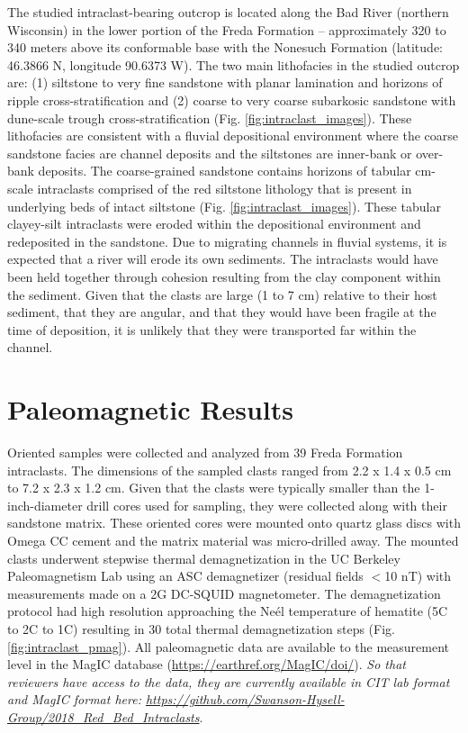\documentclass[draft]{agujournal2018}
\begin{document}
The studied intraclast-bearing outcrop is located along the Bad River (northern Wisconsin) in the lower portion of the Freda Formation -- approximately 320 to 340 meters above its conformable base with the Nonesuch Formation (latitude:  46.3866 \textdegree N, longitude 90.6373 \textdegree W). The two main lithofacies in the studied outcrop are: (1) siltstone to very fine sandstone with planar lamination and horizons of ripple cross-stratification and (2) coarse to very coarse subarkosic sandstone with dune-scale trough cross-stratification (Fig. \ref{fig:intraclast_images}). These lithofacies are consistent with a fluvial depositional environment where the coarse sandstone facies are channel deposits and the siltstones are inner-bank or over-bank deposits. The coarse-grained sandstone contains horizons of tabular cm-scale intraclasts comprised of the red siltstone lithology that is present in underlying beds of intact siltstone (Fig. \ref{fig:intraclast_images}). These tabular clayey-silt intraclasts were eroded within the depositional environment and redeposited in the sandstone. Due to migrating channels in fluvial systems, it is expected that a river will erode its own sediments. The intraclasts would have been held together through cohesion resulting from the clay component within the sediment. Given that the clasts are large (1 to 7 cm) relative to their host sediment, that they are angular, and that they would have been fragile at the time of deposition, it is unlikely that they were transported far within the channel.

\section*{Paleomagnetic Results}

Oriented samples were collected and analyzed from 39 Freda Formation intraclasts. The dimensions of the sampled clasts ranged from 2.2 x 1.4 x 0.5 cm to 7.2 x 2.3 x 1.2 cm. Given that the clasts were typically smaller than the 1-inch-diameter drill cores used for sampling, they were collected along with their sandstone matrix. These oriented cores were mounted onto quartz glass discs with Omega CC cement and the matrix material was micro-drilled away. The mounted clasts underwent stepwise thermal demagnetization in the UC Berkeley Paleomagnetism Lab using an ASC demagnetizer (residual fields $<$10 nT) with measurements made on a 2G DC-SQUID magnetometer. The demagnetization protocol had high resolution  approaching the Ne\'el temperature of hematite (5\textdegree C to 2\textdegree C to 1\textdegree C) resulting in 30 total thermal demagnetization steps (Fig. \ref{fig:intraclast_pmag}). All paleomagnetic data are available to the measurement level in the MagIC database (\url{https://earthref.org/MagIC/doi/}). \textit{So that reviewers have access to the data, they are currently available in CIT lab format and MagIC format here: \url{https://github.com/Swanson-Hysell-Group/2018_Red_Bed_Intraclasts}}.
\end{document}

